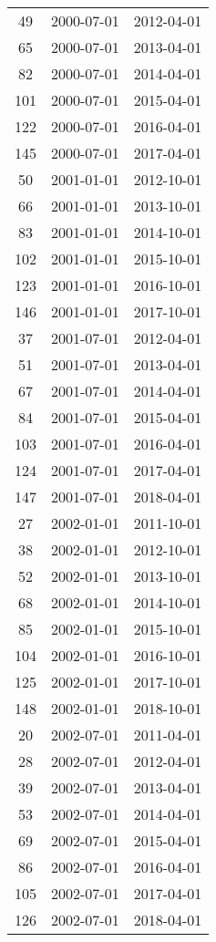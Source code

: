 \begin{tabular}{ccc}
  49 & 2000-07-01 & 2012-04-01 \\ 
  65 & 2000-07-01 & 2013-04-01 \\ 
  82 & 2000-07-01 & 2014-04-01 \\ 
  101 & 2000-07-01 & 2015-04-01 \\ 
  122 & 2000-07-01 & 2016-04-01 \\ 
  145 & 2000-07-01 & 2017-04-01 \\ 
  50 & 2001-01-01 & 2012-10-01 \\ 
  66 & 2001-01-01 & 2013-10-01 \\ 
  83 & 2001-01-01 & 2014-10-01 \\ 
  102 & 2001-01-01 & 2015-10-01 \\ 
  123 & 2001-01-01 & 2016-10-01 \\ 
  146 & 2001-01-01 & 2017-10-01 \\ 
  37 & 2001-07-01 & 2012-04-01 \\ 
  51 & 2001-07-01 & 2013-04-01 \\ 
  67 & 2001-07-01 & 2014-04-01 \\ 
  84 & 2001-07-01 & 2015-04-01 \\ 
  103 & 2001-07-01 & 2016-04-01 \\ 
  124 & 2001-07-01 & 2017-04-01 \\ 
  147 & 2001-07-01 & 2018-04-01 \\ 
  27 & 2002-01-01 & 2011-10-01 \\ 
  38 & 2002-01-01 & 2012-10-01 \\ 
  52 & 2002-01-01 & 2013-10-01 \\ 
  68 & 2002-01-01 & 2014-10-01 \\ 
  85 & 2002-01-01 & 2015-10-01 \\ 
  104 & 2002-01-01 & 2016-10-01 \\ 
  125 & 2002-01-01 & 2017-10-01 \\ 
  148 & 2002-01-01 & 2018-10-01 \\ 
  20 & 2002-07-01 & 2011-04-01 \\ 
  28 & 2002-07-01 & 2012-04-01 \\ 
  39 & 2002-07-01 & 2013-04-01 \\ 
  53 & 2002-07-01 & 2014-04-01 \\ 
  69 & 2002-07-01 & 2015-04-01 \\ 
  86 & 2002-07-01 & 2016-04-01 \\ 
  105 & 2002-07-01 & 2017-04-01 \\ 
  126 & 2002-07-01 & 2018-04-01 \\ 

\end{tabular}
